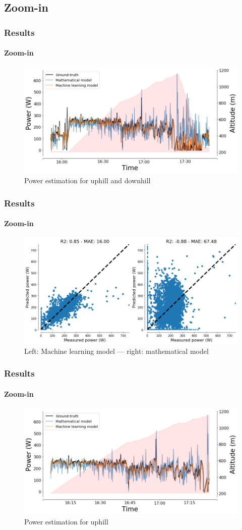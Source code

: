 \documentclass{beamer}
\begin{document}
\subsection{Zoom-in}

\begin{frame}
  \frametitle{Results}
  \framesubtitle{Zoom-in}
  \begin{figure}
    \includegraphics[width=.95\textwidth]{./images/uphill-downhill-profile.png}
    \caption{Power estimation for uphill and downhill}
  \end{figure}
\end{frame}

\begin{frame}
  \frametitle{Results}
  \framesubtitle{Zoom-in}
  \begin{figure}
    \includegraphics[width=.95\textwidth]{./images/uphill-downhill-r2.png}
    \caption{Left: Machine learning model --- right: mathematical model}
  \end{figure}
\end{frame}

\begin{frame}
  \frametitle{Results}
  \framesubtitle{Zoom-in}
  \begin{figure}
    \includegraphics[width=.95\textwidth]{./images/uphill-profile.png}
    \caption{Power estimation for uphill}
  \end{figure}
\end{frame}
\end{document}
